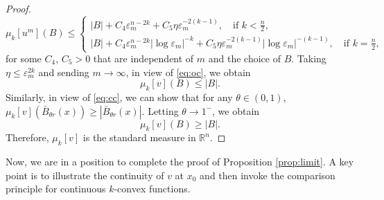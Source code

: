 \documentclass[reqno]{amsart}
\newtheorem{lemma}[theorem]{Lemma}
\theoremstyle{remark}
\theoremstyle{definition}
\numberwithin{equation}{section}
\begin{document}
\begin{proof}
\[
\mu_k[u^m](B) \leq \begin{cases}
|B| + C_4 \varepsilon_m^{n-2k} + C_5 \eta \varepsilon_m^{-2(k-1)}, \quad\text{if }k<\frac{n}{2}, \\[1.5ex]
|B| + C_4 \varepsilon_m^{n-2k} |\log\varepsilon_m|^{-k}+ C_5 \eta \varepsilon_m^{-2(k-1)}|\log\varepsilon_m|^{-(k-1)}, \quad\text{if }k=\frac{n}{2},
\end{cases}
\]
for some \( C_4\), \(C_5 > 0 \) that are independent of $m$ and the choice of \( B \). Taking \( \eta \leq \varepsilon_m^{2k} \) and sending $m\to\infty$,  in view of \eqref{eq:oc}, we obtain
\[ \mu_k[v](B) \leq |B|.\] 
Similarly, in view of \eqref{eq:cc}, we can show that for any \( \theta \in (0, 1) \), $
\mu_k[v](\bar{B}_{\theta r}(x)) \geq |\bar{B}_{\theta r}(x)| $.
Letting \( \theta \to 1^- \), we obtain 
\[ \mu_k[v](B) \geq |B|. \]
Therefore, $\mu_k[v]$ is the standard measure in $\mathbb{R}^n$.
\end{proof}


Now, we are in a position to complete the proof of Proposition \ref{prop:limit}. A key point is to illustrate the continuity of $v$ at $x_0$ and then invoke the comparison principle for continuous $k$-convex functions.
\end{document}
